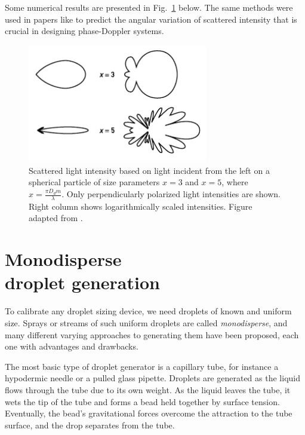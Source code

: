\documentclass[11.5pt,oneside]{book}
\newcommand*{\figref}[1]{Fig.~\ref{#1}}
\begin{document}
Some numerical results are presented in \figref{fig:angleresults} below. The
same methods were used in papers like \citet{Naqwi96} to predict the angular
variation of scattered intensity that is crucial in designing phase-Doppler
systems.

\begin{figure}
    \centering
    \includegraphics[width=0.7\textwidth]{img/scattering/results.pdf}
    \caption{Scattered light intensity based on light incident from the left on a spherical particle of size parameters $x=3$ and $x=5$, where $x = \frac{\pi D_d m}{\lambda}$. Only perpendicularly polarized light intensities are shown. Right column shows logarithmically scaled intensities. Figure adapted from \citet{Albrecht03}.}
    \label{fig:angleresults}
\end{figure}


\chapter[Monodisperse droplet generation]{Monodisperse\\droplet generation}
\label{sec:droplet-generator}

To calibrate any droplet sizing device, we need droplets of known and uniform
size. Sprays or streams of such uniform droplets are called \emph{monodisperse},
and many different varying approaches to generating them have been proposed,
each one with advantages and drawbacks.

The most basic type of droplet generator is a capillary tube, for instance a
hypodermic needle or a pulled glass pipette. Droplets are generated as the
liquid flows through the tube due to its own weight. As the liquid leaves the
tube, it wets the tip of the tube and forms a bead held together by surface
tension. Eventually, the bead's gravitational forces overcome the attraction to
the tube surface, and the drop separates from the tube.
\end{document}
